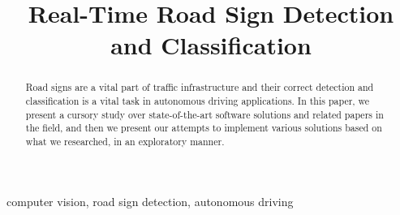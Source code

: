 \documentclass[conference]{IEEEtran}
\begin{document}
\title{Real-Time Road Sign Detection and Classification\\
}

\author{
\and
{}
\and
{}
\and
{}
}

\maketitle

\begin{abstract}
Road signs are a vital part of traffic infrastructure and their correct detection and classification
is a vital task in autonomous driving applications. In this paper, we present a cursory study over
state-of-the-art software solutions and related papers in the field, and then we present our attempts
to implement various solutions based on what we researched, in an exploratory manner.
\end{abstract}

\begin{IEEEkeywords}
computer vision, road sign detection, autonomous driving
\end{IEEEkeywords}
\end{document}

